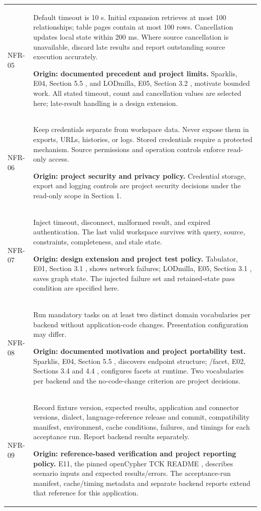 \documentclass[11pt,a4paper]{article}
\begin{document}
{\begin{longtable}{@{}P{1.35cm}P{14.35cm}@{}}
NFR-05 & Default timeout is 10 s. Initial expansion retrieves at most 100 relationships; table pages contain at most 100 rows. Cancellation updates local state within 200 ms. Where source cancellation is unavailable, discard late results and report outstanding source execution accurately.\par\smallskip \textbf{Origin: documented precedent and project limits.} Sparklis, E04, Section 5.5 \citep{sparklis}, and LODmilla, E05, Section 3.2 \citep{lodmilla}, motivate bounded work. All stated timeout, count and cancellation values are selected here; late-result handling is a design extension.\\
NFR-06 & Keep credentials separate from workspace data. Never expose them in exports, URLs, histories, or logs. Stored credentials require a protected mechanism. Source permissions and operation controls enforce read-only access.\par\smallskip \textbf{Origin: project security and privacy policy.} Credential storage, export and logging controls are project security decisions under the read-only scope in Section 1.\\
NFR-07 & Inject timeout, disconnect, malformed result, and expired authentication. The last valid workspace survives with query, source, constraints, completeness, and stale state.\par\smallskip \textbf{Origin: design extension and project test policy.} Tabulator, E01, Section 3.1 \citep{tabulator}, shows network failures; LODmilla, E05, Section 3.1 \citep{lodmilla}, saves graph state. The injected failure set and retained-state pass condition are specified here.\\
NFR-08 & Run mandatory tasks on at least two distinct domain vocabularies per backend without application-code changes. Presentation configuration may differ.\par\smallskip \textbf{Origin: documented motivation and project portability test.} Sparklis, E04, Section 5.5 \citep{sparklis}, discovers endpoint structure; /facet, E02, Sections 3.4 and 4.4 \citep{facet}, configures facets at runtime. Two vocabularies per backend and the no-code-change criterion are project decisions.\\
NFR-09 & Record fixture version, expected results, application and connector versions, dialect, language-reference release and commit, compatibility manifest, environment, cache conditions, failures, and timings for each acceptance run. Report backend results separately.\par\smallskip \textbf{Origin: reference-based verification and project reporting policy.} E11, the pinned openCypher TCK README \citep{opencypher}, describes scenario inputs and expected results/errors. The acceptance-run manifest, cache/timing metadata and separate backend reports extend that reference for this application.\\
\end{longtable}}
\end{document}

